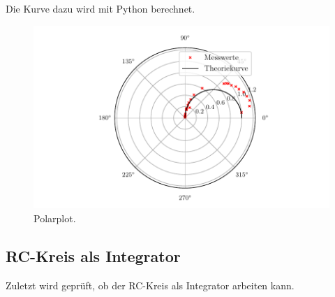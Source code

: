 \noindent Die Kurve dazu wird mit Python berechnet.
\begin{figure}[H]
  \centering
  \includegraphics{plot4.pdf}
  \caption{Polarplot.}
  \label{fig:plot}
\end{figure}

\subsection{RC-Kreis als Integrator}
\noindent Zuletzt wird geprüft, ob der RC-Kreis als Integrator arbeiten kann.

